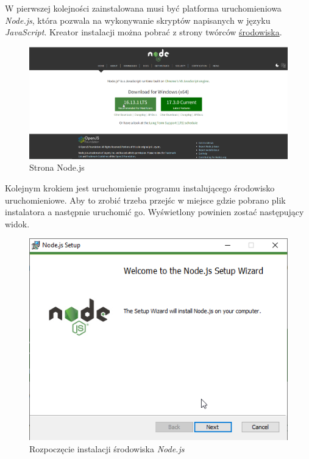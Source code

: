 \documentclass[a4paper,twoside,12pt]{book}
\begin{document}
W pierwszej kolejności zainstalowana musi być platforma uruchomieniowa \textit{Node.js}, która pozwala na wykonywanie skryptów napisanych w języku \textit{JavaScript}. Kreator instalacji można pobrać z strony twórców \href{https://nodejs.org/en/}{środowiska}.
\begin{figure}[H]
	\centering
	\includegraphics[width=0.7\linewidth]{../zrzuty_ekranu/instalacja_nodejs/node_page}
	\caption{Strona Node.js}
	\label{fig:nodepage}
\end{figure}

Kolejnym krokiem jest uruchomienie programu instalującego środowisko uruchomieniowe. Aby to zrobić trzeba przejśc w miejsce gdzie pobrano plik instalatora a następnie uruchomić go. Wyświetlony powinien zostać następujący widok.
\begin{figure}[H]
	\centering
	\includegraphics[width=0.7\linewidth]{../zrzuty_ekranu/instalacja_nodejs/node1}
	\caption{Rozpoczęcie instalacji środowiska \textit{Node.js}}
	\label{fig:node1}
\end{figure}
\end{document}
